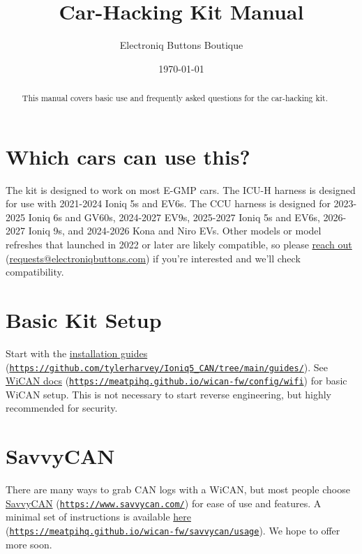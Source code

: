 \documentclass[superscriptaddress,onecolumn,floatfix]{revtex4-2}
\begin{document}
                            
\begin{abstract}
  This manual covers basic use and frequently asked questions for the car-hacking kit.
\end{abstract}
\title{Car-Hacking Kit Manual}
\author{Electroniq Buttons Boutique}
\date{\today}

\maketitle


\section{Which cars can use this?} \label{sect:eligibility}
The kit is designed to work on most E-GMP cars. The ICU-H harness is designed for use with 2021-2024 Ioniq 5s and EV6s. The CCU harness is designed for 2023-2025 Ioniq 6s and GV60s, 2024-2027 EV9s, 2025-2027 Ioniq 5s and EV6s, 2026-2027 Ioniq 9s, and 2024-2026 Kona and Niro EVs. Other models or model refreshes that launched in 2022 or later are likely compatible, so please \href{mailto:requests@electroniqbuttons.com}{reach out} (\href{mailto:requests@electroniqbuttons.com}{requests@electroniqbuttons.com}) if you're interested and we'll check compatibility. 

\section{Basic Kit Setup}
Start with the \href{https://github.com/tylerharvey/Ioniq5_CAN/tree/main/guides/}{installation guides} (\href{https://github.com/tylerharvey/Ioniq5_CAN/tree/main/guides/}{\nolinkurl{https://github.com/tylerharvey/Ioniq5_CAN/tree/main/guides/}}). See \href{https://meatpihq.github.io/wican-fw/config/wifi}{WiCAN docs} (\href{https://meatpihq.github.io/wican-fw/config/wifi}{\nolinkurl{https://meatpihq.github.io/wican-fw/config/wifi}}) for basic WiCAN setup. This is not necessary to start reverse engineering, but highly recommended for security.

\section{SavvyCAN}
There are many ways to grab CAN logs with a WiCAN, but most people choose \href{https://www.savvycan.com/}{SavvyCAN} (\href{https://www.savvycan.com/}{\nolinkurl{https://www.savvycan.com/}}) for ease of use and features. A minimal set of instructions is available \href{https://meatpihq.github.io/wican-fw/savvycan/usage}{here} (\href{https://meatpihq.github.io/wican-fw/savvycan/usage}{\nolinkurl{https://meatpihq.github.io/wican-fw/savvycan/usage}}). We hope to offer more soon.
\end{document}
